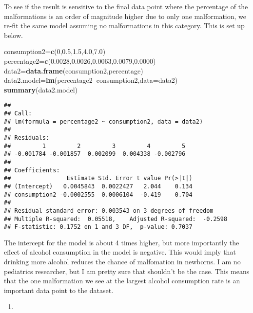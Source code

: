 \documentclass[
]{article}
\newenvironment{Shaded}{\begin{snugshade}}{\end{snugshade}}
\newcommand{\DataTypeTok}[1]{\textcolor[rgb]{0.13,0.29,0.53}{#1}}
\newcommand{\DecValTok}[1]{\textcolor[rgb]{0.00,0.00,0.81}{#1}}
\newcommand{\FloatTok}[1]{\textcolor[rgb]{0.00,0.00,0.81}{#1}}
\newcommand{\KeywordTok}[1]{\textcolor[rgb]{0.13,0.29,0.53}{\textbf{#1}}}
\newcommand{\NormalTok}[1]{#1}
\newcommand{\OperatorTok}[1]{\textcolor[rgb]{0.81,0.36,0.00}{\textbf{#1}}}
\begin{document}
To see if the result is sensitive to the final data point where the
percentage of the malformations is an order of magnitude higher due to
only one malformation, we re-fit the same model assuming no
malformations in this category. This is set up below.

\begin{Shaded}
\begin{Highlighting}[]
\NormalTok{consumption2=}\KeywordTok{c}\NormalTok{(}\DecValTok{0}\NormalTok{,}\FloatTok{0.5}\NormalTok{,}\FloatTok{1.5}\NormalTok{,}\FloatTok{4.0}\NormalTok{,}\FloatTok{7.0}\NormalTok{)}
\NormalTok{percentage2=}\KeywordTok{c}\NormalTok{(}\FloatTok{0.0028}\NormalTok{,}\FloatTok{0.0026}\NormalTok{,}\FloatTok{0.0063}\NormalTok{,}\FloatTok{0.0079}\NormalTok{,}\FloatTok{0.0000}\NormalTok{)}
\NormalTok{data2=}\KeywordTok{data.frame}\NormalTok{(consumption2,percentage)}
\NormalTok{data2.model=}\KeywordTok{lm}\NormalTok{(percentage2}\OperatorTok{~}\NormalTok{consumption2,}\DataTypeTok{data=}\NormalTok{data2)}
\KeywordTok{summary}\NormalTok{(data2.model)}
\end{Highlighting}
\end{Shaded}

\begin{verbatim}
## 
## Call:
## lm(formula = percentage2 ~ consumption2, data = data2)
## 
## Residuals:
##         1         2         3         4         5 
## -0.001784 -0.001857  0.002099  0.004338 -0.002796 
## 
## Coefficients:
##                Estimate Std. Error t value Pr(>|t|)
## (Intercept)   0.0045843  0.0022427   2.044    0.134
## consumption2 -0.0002555  0.0006104  -0.419    0.704
## 
## Residual standard error: 0.003543 on 3 degrees of freedom
## Multiple R-squared:  0.05518,    Adjusted R-squared:  -0.2598 
## F-statistic: 0.1752 on 1 and 3 DF,  p-value: 0.7037
\end{verbatim}

The intercept for the model is about 4 times higher, but more
importantly the effect of alcohol consumption in the model is negative.
This would imply that drinking more alcohol reduces the chance of
malfomation in newborns. I am no pediatrics researcher, but I am pretty
sure that shouldn't be the case. This means that the one malformation we
see at the largest alcohol consumption rate is an important data point
to the dataset.

\begin{enumerate}
\def\labelenumi{\alph{enumi})}
\setcounter{enumi}{1}
\item
\end{enumerate}
\end{document}
